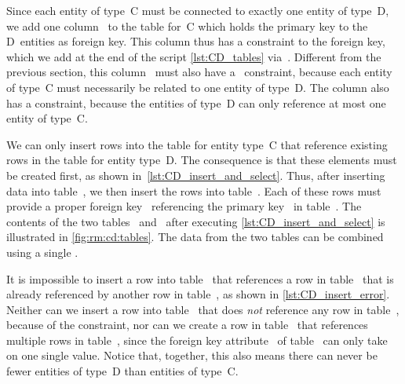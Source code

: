 Since each entity of type~C must be connected to exactly one entity of type~D, we add one column~ to the table for~C which holds the primary key to the D~entities as foreign key.
This column thus has a  constraint to the foreign key, which we add at the end of the script \cref{lst:CD_tables} via~.
Different from the previous section, this column~ must also have a ~constraint, because each entity of type~C must necessarily be related to one entity of type~D.
The column also has a  constraint, because the entities of type~D can only reference at most one entity of type~C.

We can only insert rows into the table for entity type~C that reference existing rows in the table for entity type~D.
The consequence is that these elements must be created first, as shown in~\cref{lst:CD_insert_and_select}.
Thus, after inserting data into table~, we then insert the rows into table~.
Each of these rows must provide a proper foreign key~ referencing the primary key~ in table~.
The contents of the two tables~ and~ after executing \cref{lst:CD_insert_and_select} is illustrated in \cref{fig:rm:cd:tables}.
The data from the two tables can be combined using a single .

It is impossible to insert a row into table~ that references a row in table~ that is already referenced by another row in table~, as shown in \cref{lst:CD_insert_error}.
Neither can we insert a row into table~ that does \emph{not} reference any row in table~, because of the  constraint, nor can we create a row in table~ that references multiple rows in table~, since the foreign key attribute~ of table~ can only take on one single value.
Notice that, together, this also means there can never be fewer entities of type~D than entities of type~C.%
%
\FloatBarrier%
\endhsection%
%
